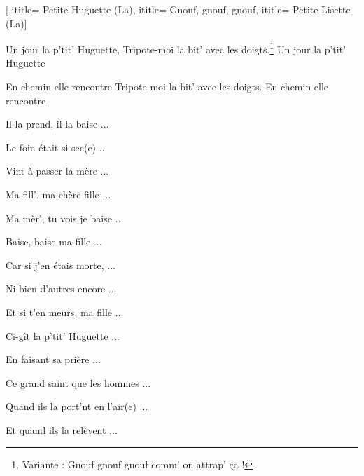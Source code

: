  [
ititle= {Petite Huguette (La)},
ititle= {Gnouf, gnouf, gnouf},
ititle= {Petite Lisette (La)}]


\beginverse
Un jour la p'tit' Huguette,
Tripote-moi la bit' avec les doigts.\footnote {Variante : Gnouf gnouf gnouf comm' on attrap' ça !}
Un jour la p'tit' Huguette
\endverse

\beginverse
En chemin elle rencontre
Tripote-moi la bit' avec les doigts.
En chemin elle rencontre
\endverse

\beginverse
Il la prend, il la baise ...
\endverse

\beginverse
Le foin était si sec(e) ...
\endverse

\beginverse
Vint à passer la mère ...
\endverse

\beginverse
Ma fill', ma chère fille ...
\endverse

\beginverse
Ma mèr', tu vois je baise ...
\endverse

\beginverse
Baise, baise ma fille ...
\endverse

\beginverse
Car si j'en étais morte, ...
\endverse

\beginverse
Ni bien d'autres encore ...
\endverse

\beginverse
Et si t'en meurs, ma fille ...
\endverse

\beginverse
Ci-gît la p'tit' Huguette ...
\endverse

\beginverse
En faisant sa prière ...
\endverse

\beginverse
Ce grand saint que les hommes ...
\endverse

\beginverse
Quand ils la port'nt en l'air(e) ...
\endverse

\beginverse
Et quand ils la relèvent ...
\endverse

\endsong 